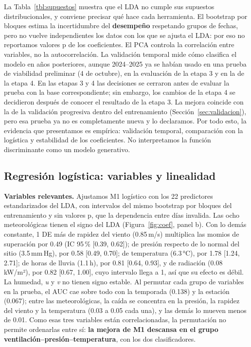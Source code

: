 La Tabla~\ref{tbl:supuestos} muestra que el LDA no cumple sus supuestos distribucionales, y conviene precisar qué hace cada herramienta. El bootstrap por bloques estima la incertidumbre del \textbf{desempeño} respetando grupos de fechas, pero no vuelve independientes los datos con los que se ajusta el LDA: por eso no reportamos valores p de los coeficientes. El PCA controla la correlación entre variables, no la autocorrelación. La validación temporal mide cómo clasifica el modelo en años posteriores, aunque 2024–2025 ya se habían usado en una prueba de viabilidad preliminar (4 de octubre), en la evaluación de la etapa 3 y en la de la etapa 4. En las etapas 3 y 4 las decisiones se cerraron antes de evaluar la prueba con la base correspondiente; sin embargo, los cambios de la etapa 4 se decidieron después de conocer el resultado de la etapa 3. La mejora coincide con la de la validación progresiva dentro del entrenamiento (Sección~\ref{sec:validacion}), pero esa prueba ya no es completamente nueva y lo declaramos. Por todo esto, la evidencia que presentamos es empírica: validación temporal, comparación con la logística y estabilidad de los coeficientes. No interpretamos la función discriminante como un modelo generativo.

\subsection{Regresión logística: variables y linealidad}\label{sec:logistica}
\textbf{Variables relevantes.} Ajustamos M1 logístico con los 22 predictores estandarizados del LDA, con intervalos del mismo bootstrap por bloques del entrenamiento y sin valores p, que la dependencia entre días invalida. Las ocho meteorológicas tienen el signo del LDA (Figura~\ref{fig:coef}, panel b). Con lo demás constante, 1 DE más de rapidez del viento (0.85\,m/s) multiplica las momios de superación por 0.49 (IC 95\,\% [0.39, 0.62]); de presión respecto de lo normal del sitio (3.5\,mm\,Hg), por 0.58 [0.49, 0.70]; de temperatura (6.3\,°C), por 1.78 [1.24, 2.71]; de horas de lluvia (1.1\,h), por 0.81 [0.64, 0.93], y de radiación (0.08\,kW/m²), por 0.82 [0.67, 1.00], cuyo intervalo llega a 1, así que su efecto es débil. La humedad, \emph{u} y \emph{v} no tienen signo estable. Al permutar cada grupo de variables en la prueba, el AUC cae sobre todo con la temporada (0.138) y la estación (0.067); entre las meteorológicas, la caída se concentra en la presión, la rapidez del viento y la temperatura (0.03 a 0.05 cada una), y las demás lo mueven menos de 0.01. Como esas tres variables están correlacionadas, la permutación no permite ordenarlas entre sí: \textbf{la mejora de M1 descansa en el grupo ventilación–presión–temperatura}, con los dos clasificadores.

